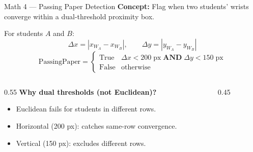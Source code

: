 \documentclass{beamer}
\begin{document}
\begin{frame}{Math 4 --- Passing Paper Detection}
\textbf{Concept:} Flag when two students' wrists converge within a dual-threshold proximity box.
\vspace{0.15cm}

For students $A$ and $B$:
\[ \Delta x = |x_{W_A} - x_{W_B}|, \qquad \Delta y = |y_{W_A} - y_{W_B}| \]
\[ \boxed{ \text{PassingPaper} = \begin{cases} \text{True} & \Delta x < 200\;\text{px} \;\textbf{AND}\; \Delta y < 150\;\text{px} \\ \text{False} & \text{otherwise} \end{cases} } \]
\begin{columns}
\begin{column}{0.55\textwidth}
\footnotesize \textbf{Why dual thresholds (not Euclidean)?}
\begin{itemize}
    \item Euclidean fails for students in different rows.
    \item Horizontal (200 px): catches same-row convergence.
    \item Vertical (150 px): excludes different rows.
\end{itemize}
\end{column}
\begin{column}{0.45\textwidth}
\centering
{}
\end{column}
\end{columns}
\end{frame}
\end{document}
